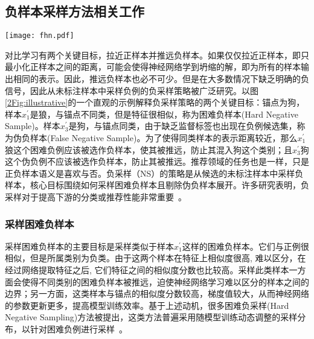 \subsection{负样本采样方法相关工作}
\begin{figure*}[!]
	\centering
	\texttt{[image: fhn.pdf]}
	\caption{困难负例和伪负例示意图}
	\label{2Fig:illustrative}
\end{figure*}
对比学习有两个关键目标，拉近正样本并推远负样本。如果仅仅拉近正样本，即只最小化正样本之间的距离，可能会使得神经网络学到坍缩的解，即为所有的样本输出相同的表示。因此，推远负样本也必不可少。但是在大多数情况下缺乏明确的负信号，因此从未标注样本中采样负例的负采样策略被广泛研究。以图\ref{2Fig:illustrative}的一个直观的示例解释负采样策略的两个关键目标：锚点为狗，样本$x_1^\prime$是狼，与锚点不同类，但是特征很相似，称为困难负样本(Hard Negative Sample)。样本$x_3^\prime$是狗，与锚点同类，由于缺乏监督标签也出现在负例候选集，称为伪负样本(False Negative Sample)。为了使得同类样本的表示距离较近，那么$x_1^\prime$狼这个困难负例应该被选作负样本，使其被推远，防止其混入狗这个类别；且$x_3^\prime$狗这个伪负例不应该被选作负样本，防止其被推远。推荐领域的任务也是一样，只是正负样本语义是喜欢与否。负采样（NS）的策略是从候选的未标注样本中采样负样本，核心目标围绕如何采样困难负样本且剔除伪负样本展开。许多研究表明，负采样对于提高下游的分类或推荐性能非常重要~\cite{Steffen:2014:WSDM,Zhang:2013:SIGIR,Ding:2020:NIPS,Park:2019:WWW,Huang:2021:KDD,Ding:2019:IJCAI,Yang:2020:KDD}。

\subsubsection{采样困难负样本}
采样困难负样本的主要目标是采样类似于样本$x_1^\prime$这样的困难负样本。它们与正例很相似，但是所属类别为负类。由于这两个样本在特征上相似度很高, 难以区分，在经过网络提取特征之后, 它们特征之间的相似度分数也比较高。采样此类样本一方面会使得不同类别的困难负样本被推远，迫使神经网络学习难以区分的样本之间的边界；另一方面，这类样本与锚点的相似度分数较高，梯度值较大，从而神经网络的参数更新更多，提高模型训练效率。基于上述动机，很多困难负采样(Hard Negative Sampling)方法被提出，这类方法普遍采用随模型训练动态调整的采样分布，以针对困难负例进行采样~\cite{Steffen:2014:WSDM,Zhang:2013:SIGIR,Ding:2020:NIPS,Park:2019:WWW,Huang:2021:KDD,Ding:2019:IJCAI}。

